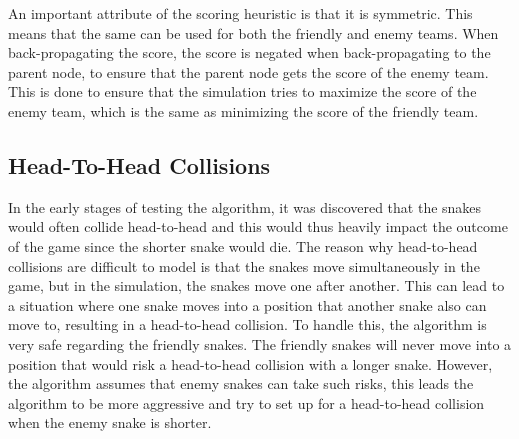 \documentclass[a4paper,12pt]{article}
\begin{document}
An important attribute of the scoring heuristic is that it is symmetric. This means that the same can be used for both the friendly and enemy teams. When back-propagating the score, the score is negated when back-propagating to the parent node, to ensure that the parent node gets the score of the enemy team. This is done to ensure that the simulation tries to maximize the score of the enemy team, which is the same as minimizing the score of the friendly team.






\subsection{Head-To-Head Collisions} %

In the early stages of testing the algorithm, it was discovered that the snakes would often collide head-to-head and this would thus heavily impact the outcome of the game since the shorter snake would die. %
The reason why head-to-head collisions are difficult to model is that the snakes move simultaneously in the game, but in the simulation, the snakes move one after another. This can lead to a situation where one snake moves into a position that another snake also can move to, resulting in a head-to-head collision. To handle this, the algorithm is very safe regarding the friendly snakes. The friendly snakes will never move into a position that would risk a head-to-head collision with a longer snake. However, the algorithm assumes that enemy snakes can take such risks, this leads the algorithm to be more aggressive and try to set up for a head-to-head collision when the enemy snake is shorter.






\end{document}
